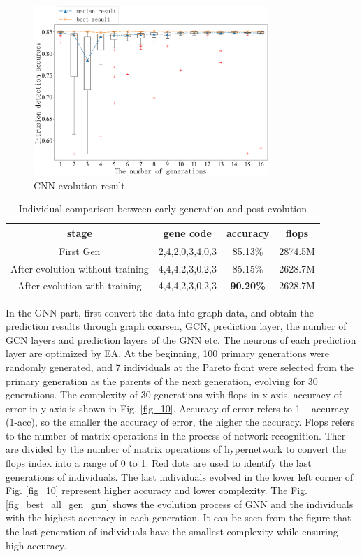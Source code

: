 \documentclass[lettersize,journal]{IEEEtran}
\begin{document}
\begin{figure}[!t]
\centering
\includegraphics[width=3.5in]{cnn_evo}
\caption{CNN evolution result.}
\label{fig_9}
\end{figure}

\begin{table}[!t]
\caption{Individual comparison between early generation and post evolution\label{table3}}
\centering
\begin{tabular}{cccc}
\hline
stage & gene code & accuracy	 & flops\\
\hline
First Gen &  2,4,2,0,3,4,0,3 &  85.13\% &  2874.5M\\
After evolution without training & 4,4,4,2,3,0,2,3 & 85.15\% & 2628.7M\\
After evolution with training & 4,4,4,2,3,0,2,3 & \textbf{90.20\%} & 2628.7M\\
\hline
\end{tabular}
\end{table}

In the GNN part, first convert the data into graph data, and obtain the prediction results through graph coarsen, GCN, prediction layer, the number of GCN layers and prediction layers of the GNN etc. The neurons of each prediction layer are optimized by EA. At the beginning, 100 primary generations were randomly generated, and 7 individuals at the Pareto front were selected from the primary generation as the parents of the next generation, evolving for 30 generations. The complexity of 30 generations with flops in x-axis, accuracy of error in y-axis is shown in Fig. \ref{fig_10}. Accuracy of error refers to 1 – accuracy (1-acc), so the smaller the accuracy of error, the higher the accuracy.  Flops refers to the number of matrix operations in the process of network recognition. Ther are divided by the number of matrix operations of hypernetwork to convert the flops index into a range of 0 to 1. Red dots are used to identify the last generations of individuals.  The last individuals evolved in the lower left corner of Fig. \ref{fig_10} represent higher accuracy and lower complexity. The Fig. \ref{fig_best_all_gen_gnn} shows the evolution process of GNN and the individuals with the highest accuracy in each generation. It can be seen from the figure that the last generation of individuals have the smallest complexity while ensuring high accuracy.
\end{document}
